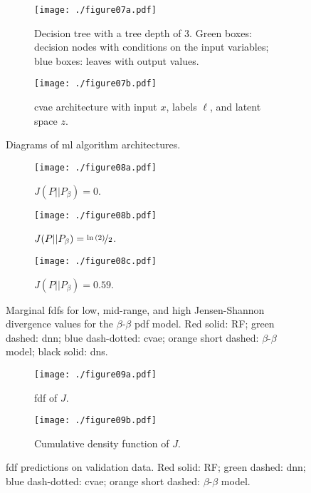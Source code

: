 \documentclass[review]{elsarticle}
\begin{document}
\clearpage\newpage
\begin{figure}[!tbp]%
  \centering%
  \begin{subfigure}[t]{0.48\textwidth}%
    \centering
    \texttt{[image: ./figure07a.pdf]}%
    \caption{Decision tree with a tree depth of 3. Green boxes: decision nodes with conditions on the input variables; blue boxes: leaves with output values.}\label{fig:rf}%
  \end{subfigure}\hfill%
  \begin{subfigure}[t]{0.48\textwidth}%
    \centering
    \texttt{[image: ./figure07b.pdf]}%
    \caption{\Gls{cvae} architecture with input $x$, labels $\ell$, and latent space $z$.}\label{fig:cvae}%
  \end{subfigure}%
  \caption{Diagrams of \gls{ml} algorithm architectures.}
\end{figure}%

\clearpage\newpage
\begin{figure}[!tbp]%
  \centering%
  \begin{subfigure}[t]{\textwidth}%
    \texttt{[image: ./figure08a.pdf]}%
    \caption{$J(P||P_{\beta})=0$.}\label{fig:}%
  \end{subfigure}\hfill%
  \begin{subfigure}[t]{\textwidth}%
    \texttt{[image: ./figure08b.pdf]}%
    \caption{$J(P||P_{\beta})=\nicefrac{\ln{(2)}}{2}$.}\label{fig:pdfs_hilo_2}%
  \end{subfigure}\hfill%
  \begin{subfigure}[t]{\textwidth}%
    \texttt{[image: ./figure08c.pdf]}%
    \caption{$J(P||P_{\beta})=0.59$.}\label{fig:}%
  \end{subfigure}%
  \caption{Marginal \glspl{fdf} for low, mid-range, and high Jensen-Shannon divergence values for the $\beta$-$\beta$ \gls{pdf} model. Red solid: RF; green dashed: \gls{dnn}; blue dash-dotted: \gls{cvae}; orange short dashed: $\beta$-$\beta$ model; black solid: \gls{dns}.}\label{fig:pdfs_hilo}%
\end{figure}%

\clearpage\newpage
\begin{figure}[!tbp]%
  \centering%
  \begin{subfigure}[t]{0.48\textwidth}%
    \texttt{[image: ./figure09a.pdf]}%
    \caption{\Gls{fdf} of $J$.}\label{fig:jsd_pdf}%
  \end{subfigure}\hfill%
  \begin{subfigure}[t]{0.48\textwidth}%
    \texttt{[image: ./figure09b.pdf]}%
    \caption{Cumulative density function of $J$.}\label{fig:jsd_cdf}%
  \end{subfigure}%
  \caption{\Gls{fdf} predictions on validation data. Red solid: RF; green dashed: \gls{dnn}; blue dash-dotted: \gls{cvae}; orange short dashed: $\beta$-$\beta$ model.}\label{fig:jsd}%
\end{figure}%
\end{document}
